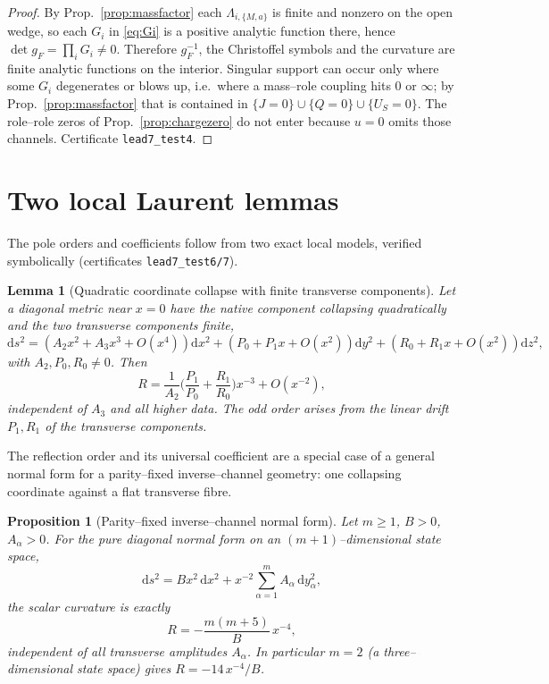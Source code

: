 \documentclass[11pt]{article}
\newtheorem{lemma}[theorem]{Lemma}
\newtheorem{proposition}[theorem]{Proposition}
\newcommand{\dd}{\mathrm{d}}
\begin{document}
\begin{proof}
By Prop.~\ref{prop:massfactor} each $\Lambda_{i,\{M,a\}}$ is finite and nonzero on the open
wedge, so each $G_i$ in \eqref{eq:Gi} is a positive analytic function there, hence
$\det g_F=\prod_iG_i\neq0$. Therefore $g_F^{-1}$, the Christoffel symbols and the curvature are
finite analytic functions on the interior. Singular support can occur only where some $G_i$
degenerates or blows up, i.e.\ where a mass--role coupling hits $0$ or $\infty$; by
Prop.~\ref{prop:massfactor} that is contained in $\{J=0\}\cup\{Q=0\}\cup\{U_S=0\}$. The
role--role zeros of Prop.~\ref{prop:chargezero} do not enter because $u=0$ omits those
channels. Certificate \texttt{lead7\_test4}.
\end{proof}

\section{Two local Laurent lemmas}
\label{sec:lemmas}

The pole orders and coefficients follow from two exact local models, verified symbolically
(certificates \texttt{lead7\_test6/7}).

\begin{lemma}[Quadratic coordinate collapse with finite transverse components]
\label{lem:generic}
Let a diagonal metric near $x=0$ have the native component collapsing quadratically and the two
transverse components finite,
\[
\dd s^2=(A_2x^2+A_3x^3+O(x^4))\dd x^2+(P_0+P_1x+O(x^2))\dd y^2+(R_0+R_1x+O(x^2))\dd z^2,
\]
with $A_2,P_0,R_0\neq0$. Then
\[
R=\frac1{A_2}\Big(\frac{P_1}{P_0}+\frac{R_1}{R_0}\Big)x^{-3}+O(x^{-2}),
\]
independent of $A_3$ and all higher data. The odd order arises from the linear drift $P_1,R_1$
of the transverse components.
\end{lemma}

The reflection order and its universal coefficient are a special case of a general normal
form for a parity--fixed inverse--channel geometry: one collapsing coordinate against a flat
transverse fibre.

\begin{proposition}[Parity--fixed inverse--channel normal form]
\label{prop:mm5}
Let $m\ge1$, $B>0$, $A_\alpha>0$. For the pure diagonal normal form on an
$(m{+}1)$--dimensional state space,
\[
\dd s^2=Bx^2\,\dd x^2+x^{-2}\sum_{\alpha=1}^{m}A_\alpha\,\dd y_\alpha^2,
\]
the scalar curvature is exactly
\[
R=-\frac{m(m+5)}{B}\,x^{-4},
\]
independent of all transverse amplitudes $A_\alpha$. In particular $m=2$ (a three--dimensional
state space) gives $R=-14\,x^{-4}/B$.
\end{proposition}
\end{document}
